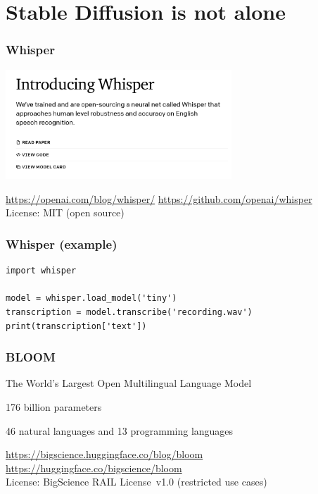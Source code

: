 \documentclass[17pt,aspectratio=169,hyperref={pdfusetitle,colorlinks,allcolors=olive}]{beamer}
\begin{document}
\section{Stable Diffusion is not alone}

\begin{frame}[fragile]
  \frametitle{Whisper}

  \includegraphics[width=8.5cm]{figs/whisper}

  \begin{flushright}
    {\scriptsize
    \url{https://openai.com/blog/whisper/}
    \url{https://github.com/openai/whisper} \\
    License: MIT (open source) \\
  }
  \end{flushright}

\end{frame}


\begin{frame}[fragile]
  \frametitle{Whisper (example)}

{\small
\begin{verbatim}
import whisper

model = whisper.load_model('tiny')
transcription = model.transcribe('recording.wav')
print(transcription['text'])
\end{verbatim}
}

\end{frame}


\begin{frame}[fragile]
  \frametitle{BLOOM}

  The World’s Largest Open Multilingual Language Model  

  176 billion parameters

  46 natural languages and 13 programming languages

  \begin{flushright}
    {\small
    \url{https://bigscience.huggingface.co/blog/bloom} \\
    \url{https://huggingface.co/bigscience/bloom} \\ }
    License: BigScience RAIL License v1.0 (restricted use cases) \\
  \end{flushright}

\end{frame}
\end{document}
